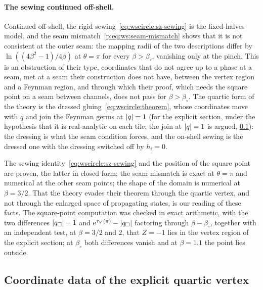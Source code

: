 \paragraph{The sewing continued off-shell.}
Continued off-shell, the rigid sewing~\eqref{eq:wscircle:sz-sewing} is the fixed-halves model, and the seam mismatch~\eqref{p:eq:ws:seam-mismatch} shows that it is not consistent at the outer seam: the mapping radii of the two descriptions differ by $\ln ((4 \beta^2 - 1) / 4 \beta)$ at $\theta = \pi$ for every $\beta > \beta_\circ$, vanishing only at the pinch.
This is an obstruction of their type, coordinates that do not agree up to a phase at a seam, met at a seam their construction does not have, between the vertex region and a Feynman region, and through which their proof, which needs the square point on a seam between channels, does not pass for $\beta > \beta_\circ$.
The quartic form of the theory is the dressed gluing~\eqref{eq:wscircle:theorem}, whose coordinates move with $q$ and join the Feynman germs at ${|q|} = 1$ (for the explicit section, under the hypothesis that it is real-analytic on each tile; the join at ${|q|} = 1$ is argued, \cref{sec:wscircle:coordinates}): the dressing is what the seam condition forces, and the on-shell sewing is the dressed one with the dressing switched off by $h_i = 0$.

The sewing identity~\eqref{eq:wscircle:sz-sewing} and the position of the square point are proven, the latter in closed form; the seam mismatch is exact at $\theta = \pi$ and numerical at the other seam points; the shape of the domain is numerical at $\beta = 3 / 2$.
That the theory evades their theorem through the quartic vertex, and not through the enlarged space of propagating states, is our reading of these facts.
The square-point computation was checked in exact arithmetic, with the two differences ${|q_\square|} - 1$ and $\mathrm{e}^{\tau_V(\pi)} - {|q_\square|}$ factoring through $\beta - \beta_\circ$, together with an independent test, at $\beta = 3 / 2$ and $2$, that $Z = - 1$ lies in the vertex region of the explicit section; at $\beta_\circ$ both differences vanish and at $\beta = 1.1$ the point lies outside.

\subsection{Coordinate data of the explicit quartic vertex}
\label{sec:wscircle:coordinates}


